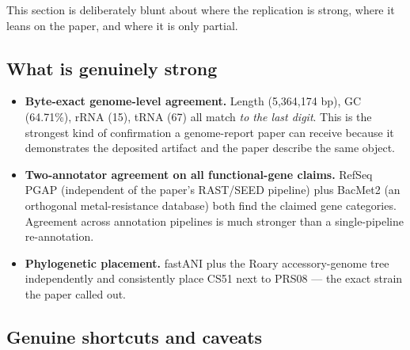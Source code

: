 \documentclass[11pt]{article}
\begin{document}
This section is deliberately blunt about where the replication is strong, where
it leans on the paper, and where it is only partial.

\subsection{What is genuinely strong}

\begin{itemize}[leftmargin=*]
\item \textbf{Byte-exact genome-level agreement.} Length (5{,}364{,}174 bp), GC
(64.71\%), rRNA (15), tRNA (67) all match \emph{to the last digit}. This is the
strongest kind of confirmation a genome-report paper can receive because it
demonstrates the deposited artifact and the paper describe the same object.
\item \textbf{Two-annotator agreement on all functional-gene claims.} RefSeq
PGAP (independent of the paper's RAST/SEED pipeline) plus BacMet2 (an
orthogonal metal-resistance database) both find the claimed gene categories.
Agreement across annotation pipelines is much stronger than a single-pipeline
re-annotation.
\item \textbf{Phylogenetic placement.} fastANI plus the Roary accessory-genome
tree independently and consistently place CS51 next to PRS08 --- the exact
strain the paper called out.
\end{itemize}

\subsection{Genuine shortcuts and caveats}
\end{document}
